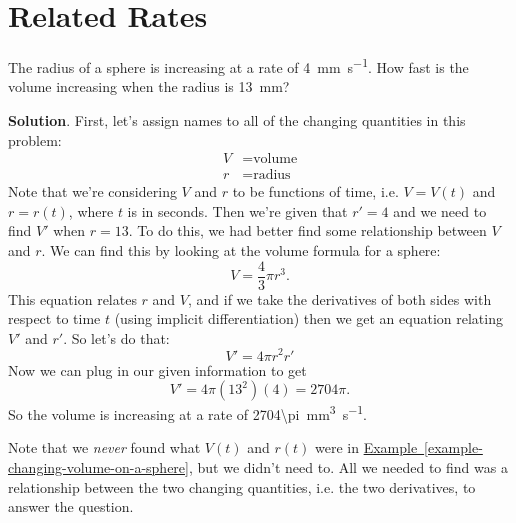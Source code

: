 \documentclass[10pt,]{book}
\theoremstyle{ptxplainnotitle}
\theoremstyle{ptxplaintitle}
\theoremstyle{ptxplainnotitle}
\theoremstyle{ptxplaintitle}
\theoremstyle{ptxplainnotitle}
\theoremstyle{ptxplaintitle}
\theoremstyle{ptxdefinitionnotitle}
\theoremstyle{ptxdefinitiontitle}
\theoremstyle{ptxdefinitionnotitle}
\theoremstyle{ptxdefinitiontitle}
\theoremstyle{ptxdefinitionnotitle}
\theoremstyle{ptxdefinitiontitle}
\theoremstyle{ptxdefinitionnotitle}
\theoremstyle{ptxdefinitiontitle}
\theoremstyle{ptxdefinitionnotitle}
\theoremstyle{ptxdefinitiontitle}
\numberwithin{equation}{section}
\begin{document}
\section[{Related Rates}]{Related Rates}\label{section-related-rates}
\begin{example}\label{example-changing-volume-on-a-sphere}
\hypertarget{p-169}{}%
The radius of a sphere is increasing at a rate of \SI{4}{\milli\meter\per\second}. How fast is the volume increasing when the radius is \SI{13}{\milli\meter}?%
\par\smallskip%
\noindent\textbf{Solution}.\hypertarget{solution-37}{}\quad%
\hypertarget{p-170}{}%
First, let's assign names to all of the changing quantities in this problem:%
\begin{align*}
V & = \text{volume} \\
r & = \text{radius} 
\end{align*}
Note that we're considering \(V\) and \(r\) to be functions of time, i.e. \(V = V(t)\) and \(r=r(t)\), where \(t\) is in seconds. Then we're given that \(r' = 4\) and we need to find \(V'\) when \(r=13\). To do this, we had better find some relationship between \(V\) and \(r\). We can find this by looking at the volume formula for a sphere:%
\begin{equation*}
V = \frac{4}{3}\pi r^{3}.
\end{equation*}
This equation relates \(r\) and \(V\), and if we take the derivatives of both sides with respect to time \(t\) (using implicit differentiation) then we get an equation relating \(V'\) and \(r'\). So let's do that:%
\begin{equation*}
V' = 4\pi r^{2}r'
\end{equation*}
Now we can plug in our given information to get%
\begin{equation*}
V' = 4\pi(13^{2})(4) = 2704\pi.
\end{equation*}
So the volume is increasing at a rate of \SI{2704\pi}{\milli\meter\tothe{3}\per\second}.%
\end{example}
\hypertarget{p-171}{}%
Note that we \emph{never} found what \(V(t)\) and \(r(t)\) were in \hyperref[example-changing-volume-on-a-sphere]{Example~\ref{example-changing-volume-on-a-sphere}}, but we didn't need to. All we needed to find was a relationship between the two changing quantities, i.e. the two derivatives, to answer the question.%
\end{document}
